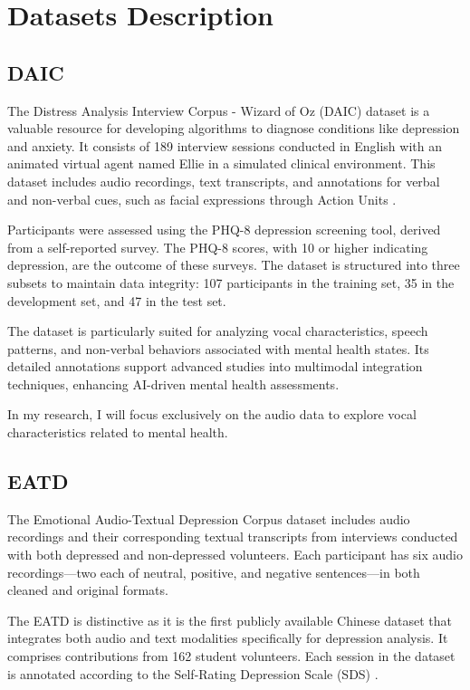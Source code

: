 \section{Datasets Description}
\subsection{DAIC}
The Distress Analysis Interview Corpus - Wizard of Oz (DAIC) \cite{DAICWOZ} dataset is a valuable resource for developing algorithms to diagnose conditions like depression and anxiety. It consists of 189 interview sessions conducted in English with an animated virtual agent named Ellie in a simulated clinical environment. This dataset includes audio recordings, text transcripts, and annotations for verbal and non-verbal cues, such as facial expressions through Action Units \cite{AU}.

Participants were assessed using the PHQ-8 depression screening tool, derived from a self-reported survey. The PHQ-8 scores, with 10 or higher indicating depression, are the outcome of these surveys. The dataset is structured into three subsets to maintain data integrity: 107 participants in the training set, 35 in the development set, and 47 in the test set.

The dataset is particularly suited for analyzing vocal characteristics, speech patterns, and non-verbal behaviors associated with mental health states. Its detailed annotations support advanced studies into multimodal integration techniques, enhancing AI-driven mental health assessments.

In my research, I will focus exclusively on the audio data to explore vocal characteristics related to mental health. 

\subsection{EATD}
The Emotional Audio-Textual Depression Corpus \cite{shen2022automaticdepressiondetectionemotional} dataset includes audio recordings and their corresponding textual transcripts from interviews conducted with both depressed and non-depressed volunteers. Each participant has six audio recordings—two each of neutral, positive, and negative sentences—in both cleaned and original formats.

The EATD is distinctive as it is the first publicly available Chinese dataset that integrates both audio and text modalities specifically for depression analysis. It comprises contributions from 162 student volunteers. Each session in the dataset is annotated according to the Self-Rating Depression Scale (SDS) \cite{SDS}.

